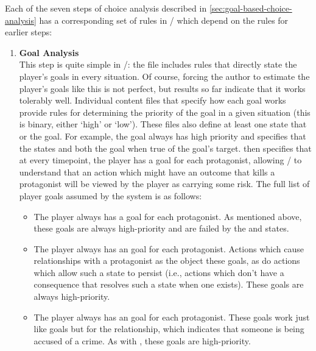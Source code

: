 Each of the seven steps of choice analysis described in \cref{sec:goal-based-choice-analysis} has a corresponding set of rules in \dunyazad/ which depend on the rules for earlier steps:
%
\begin{enumerate}
  \item %
    \textbf{Goal Analysis} \\
    This step is quite simple in \dunyazad/: the file  includes rules that directly state the player's goals in every situation.
    Of course, forcing the author to estimate the player's goals like this is not perfect, but results so far indicate that it works tolerably well.
    Individual content files that specify how each goal works provide rules for determining the priority of the goal in a given situation (this is binary, either `high' or `low').
    These files also define at least one state that    or  the goal.
    For example, the  goal always has high priority and specifies that the states  and  both  the goal when true of the goal's target.
     then specifies that at every timepoint, the player has a  goal for each protagonist, allowing \dunyazad/ to understand that an action which might have an outcome that kills a protagonist will be viewed by the player as carrying some risk.
    The full list of player goals assumed by the system is as follows:
    \begin{itemize}
      \item The player always has a  goal for each protagonist. As mentioned above, these goals are always high-priority and are failed by the  and  states.
      \item The player always has an  goal for each protagonist. Actions which cause  relationships with a protagonist as the object  these goals, as do actions which allow such a state to persist (i.e., actions which don't have a consequence that resolves such a state when one exists). These goals are always high-priority.
      \item The player always has an  goal for each protagonist. These goals work just like  goals but for the  relationship, which indicates that someone is being accused of a crime. As with , these goals are high-priority.

\end{itemize}
\end{enumerate}
